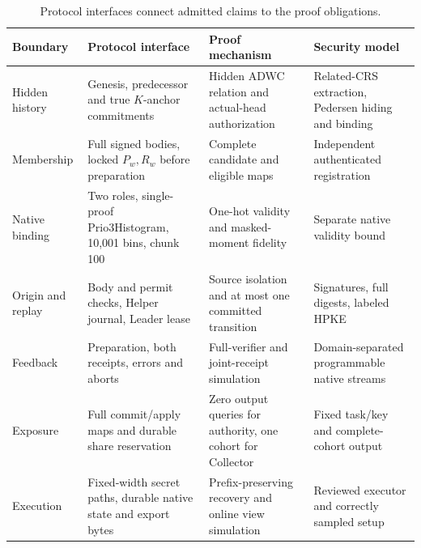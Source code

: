\begin{table}[t]
\centering
\caption{Protocol interfaces connect admitted claims to the proof obligations.}
\label{tab:security-implementation}
\label{tab:object-map}
\footnotesize
\begin{tabularx}{\textwidth}{@{}lYYY@{}}
\toprule
Boundary & Protocol interface & Proof mechanism & Security model \\
\midrule
Hidden history & Genesis, predecessor and true \(K\)-anchor commitments & Hidden ADWC relation and actual-head authorization & Related-CRS extraction, Pedersen hiding and binding \\
Membership & Full signed bodies, locked \(P_w,R_w\) before preparation & Complete candidate and eligible maps & Independent authenticated registration \\
Native binding & Two roles, single-proof Prio3Histogram, 10,001 bins, chunk 100 & One-hot validity and masked-moment fidelity & Separate native validity bound \\
Origin and replay & Body and permit checks, Helper journal, Leader lease & Source isolation and at most one committed transition & Signatures, full digests, labeled HPKE \\
Feedback & Preparation, both receipts, errors and aborts & Full-verifier and joint-receipt simulation & Domain-separated programmable native streams \\
Exposure & Full commit/apply maps and durable share reservation & Zero output queries for authority, one cohort for Collector & Fixed task/key and complete-cohort output \\
Execution & Fixed-width secret paths, durable native state and export bytes & Prefix-preserving recovery and online view simulation & Reviewed executor and correctly sampled setup \\
\bottomrule
\end{tabularx}
\end{table}
